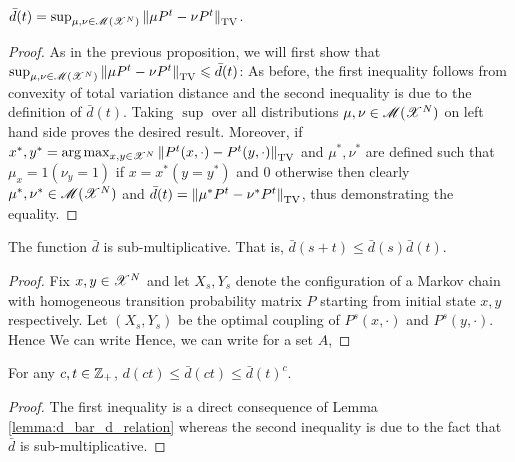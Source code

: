 \documentclass[letterpaper,english,10pt]{article}
\begin{document}
\begin{prop}
$\bar{d}(t) = \sup_{\mu, \nu \in \mathscr{M}(\mathscr{X}^N)}\left\lVert\mu P^t - \nu P^t\right\rVert_{\text{TV}}$.
\end{prop}
\begin{proof}
As in the previous proposition, we will first show that $\sup_{\mu, \nu \in \mathscr{M}(\mathscr{X}^N)}\left\lVert\mu P^t - \nu P^t\right\rVert_{\text{TV}} \leqslant \bar{d}(t)$:
As before, the first inequality follows from convexity of total variation distance and the second inequality is due to the definition of $\bar{d}(t)$. Taking $\sup$ over all distributions $\mu, \nu \in \mathscr{M}(\mathscr{X}^N)$ on left hand side proves the desired result.
Moreover, if $x^\ast, y^\ast = \mathrm{arg}\max_{x, y \in \mathscr{X}^N} \left\lVert P^t(x, \cdot) - P^t(y, \cdot)\right\rVert_{\text{TV}}$ and $\mu^\ast, \nu^\ast$ are defined such that $\mu_x=1 (\nu_y = 1)$ if $x = x^\ast (y = y^\ast)$ and $0$ otherwise then clearly $\mu^\ast, \nu^\ast \in \mathscr{M}(\mathscr{X}^N)$ and $\bar{d}(t) = \left\lVert\mu^\ast P^t - \nu^\ast P^t\right\rVert_{\text{TV}}$, thus demonstrating the equality.
\end{proof}
\begin{lem}
The function $\bar{d}$ is sub-multiplicative. 
That is, $\bar{d}(s + t) \le \bar{d}(s)\bar{d}(t)$. 
\end{lem}
\begin{proof} 
Fix $x, y \in \mathscr{X}^N$ and let $X_s, Y_s$ denote the configuration of a Markov chain with homogeneous transition probability matrix $P$ starting from initial state $x,y$ respectively. 
Let $(X_s, Y_s)$ be the optimal coupling of $P^s(x, \cdot)$ and $P^s(y, \cdot)$. 
Hence 
We can write 
Hence, we can write for a set $A$, 
\end{proof}

\begin{prop}
For any $c, t \in \mathbb{Z}_+$, $d(ct) \le \bar{d}(ct) \le \bar{d}(t)^c$.
\end{prop}
\begin{proof}
The first inequality is a direct consequence of Lemma \ref{lemma:d_bar_d_relation} whereas the second inequality is due to the fact that $\bar{d}$ is sub-multiplicative.
\end{proof}
\end{document}
